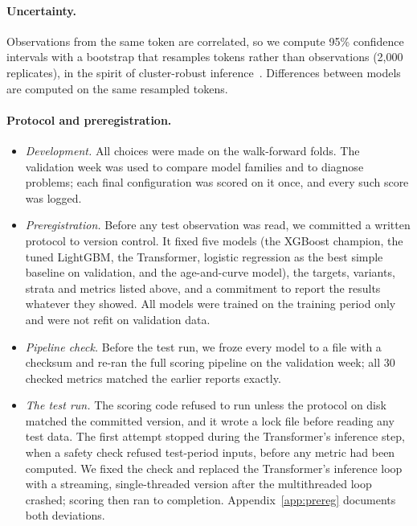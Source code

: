\paragraph{Uncertainty.}
Observations from the same token are correlated, so we compute 95\% confidence intervals with a bootstrap that resamples tokens rather than observations (2,000 replicates), in the spirit of cluster-robust inference~\citep{cameron2008bootstrap}. Differences between models are computed on the same resampled tokens.

\paragraph{Protocol and preregistration.}
\begin{itemize}
  \item \emph{Development.} All choices were made on the walk-forward folds. The validation week was used to compare model families and to diagnose problems; each final configuration was scored on it once, and every such score was logged.
  \item \emph{Preregistration.} Before any test observation was read, we committed a written protocol to version control. It fixed five models (the XGBoost champion, the tuned LightGBM, the Transformer, logistic regression as the best simple baseline on validation, and the age-and-curve model), the targets, variants, strata and metrics listed above, and a commitment to report the results whatever they showed. All models were trained on the training period only and were not refit on validation data.
  \item \emph{Pipeline check.} Before the test run, we froze every model to a file with a checksum and re-ran the full scoring pipeline on the validation week; all 30 checked metrics matched the earlier reports exactly.
  \item \emph{The test run.} The scoring code refused to run unless the protocol on disk matched the committed version, and it wrote a lock file before reading any test data. The first attempt stopped during the Transformer's inference step, when a safety check refused test-period inputs, before any metric had been computed. We fixed the check and replaced the Transformer's inference loop with a streaming, single-threaded version after the multithreaded loop crashed; scoring then ran to completion. Appendix~\ref{app:prereg} documents both deviations.
\end{itemize}
